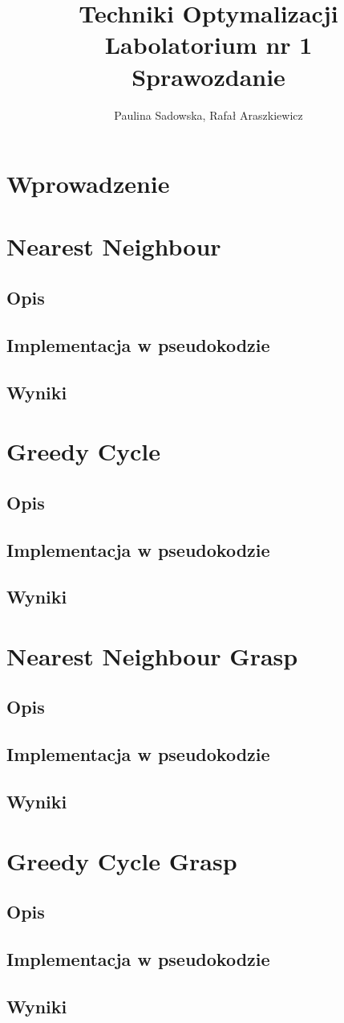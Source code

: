 \documentclass[a4paper 10pt]{article}
\title{\textbf{Techniki Optymalizacji} \\
Labolatorium nr 1 \\
Sprawozdanie}
\author{Paulina Sadowska, Rafał Araszkiewicz}
\begin{document}
\maketitle

\section{Wprowadzenie}

\section{Nearest Neighbour}
\subsection{Opis}
\subsection{Implementacja w pseudokodzie}
\subsection{Wyniki}

\section{Greedy Cycle}
\subsection{Opis}
\subsection{Implementacja w pseudokodzie}
\subsection{Wyniki}

\section{Nearest Neighbour Grasp}
\subsection{Opis}
\subsection{Implementacja w pseudokodzie}
\subsection{Wyniki}

\section{Greedy Cycle Grasp}
\subsection{Opis}
\subsection{Implementacja w pseudokodzie}
\subsection{Wyniki}
\end{document}

